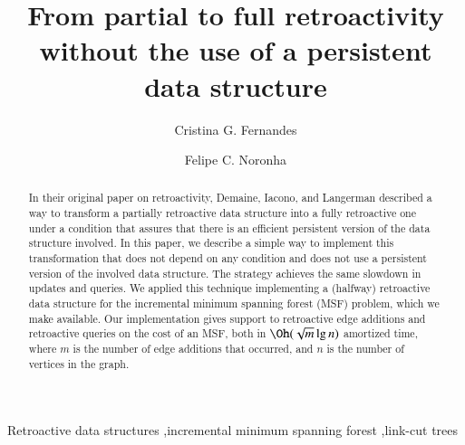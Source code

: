 \documentclass[3p,times,procedia]{elsarticle}
\begin{document}
\begin{frontmatter}




\title{From partial to full retroactivity without the use of a persistent data structure}


\author{Cristina G. Fernandes}
\author{Felipe C. Noronha}
\address{Department of Computer Science, University of São Paulo, Brazil}

\begin{abstract}
    In their original paper on retroactivity, Demaine, Iacono, and Langerman described 
    a way to transform a partially retroactive data structure into a fully retroactive 
    one under a condition that assures that there is an efficient persistent version 
    of the data structure involved. In this paper, we describe a simple way to implement 
    this transformation that does not depend on any condition and does not use a 
    persistent version of the involved data structure. The strategy achieves the 
    same slowdown in updates and queries. We applied this technique implementing a (halfway) 
    retroactive data structure for the incremental minimum spanning forest (MSF) problem,
    which we make available. Our implementation gives support to retroactive edge additions 
    and retroactive queries on the cost of an MSF, both in $\Oh(\sqrt{m}\lg n)$ amortized time, 
    where $m$ is the number of edge additions that occurred, and $n$ is the number of 
    vertices in the graph.
\end{abstract}

\begin{keyword}
    Retroactive data structures \sep incremental minimum spanning forest \sep link-cut trees
\end{keyword}

\end{frontmatter}
\end{document}
